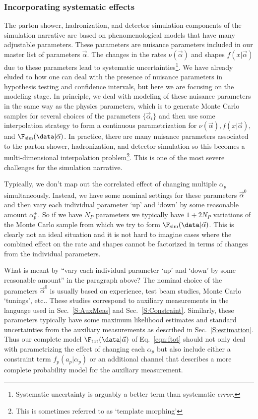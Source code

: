 \subsubsection{Incorporating systematic effects}


The parton shower, hadronization, and detector simulation components of the simulation narrative are based on phenomenological models that have many adjustable parameters.  These parameters are nuisance parameters included in our master list of parameters $\vec\alpha$.  The changes in the rates $\nu(\vec\alpha)$ and shapes $f(x|\vec\alpha)$ due to these parameters lead to systematic uncertainties\footnote{Systematic uncertainty is arguably a better term than systematic \textit{error}.}.  We have already eluded to how one can deal with the presence of nuisance parameters in hypothesis testing and confidence intervals, but here we are focusing on the modeling stage.  In principle, we deal with modeling of these nuisance parameters in the same way as the physics parameters, which is to generate Monte Carlo samples for several choices of the parameters $\{\vec\alpha_i\}$ and then use some interpolation strategy to form a continuous parametrization for $\nu(\vec\alpha), f(x|\vec\alpha)$, and $\F_{\rm sim}(\data|\vec\alpha)$.  In practice, there are many nuisance parameters associated to the parton shower, hadronization, and detector simulation so this becomes a multi-dimensional interpolation problem\footnote{This is sometimes referred to as `template morphing'}.  This is one of the most severe challenges for the simulation narrative.  


Typically, we don't map out the correlated effect of changing multiple $\alpha_p$ simultaneously.  Instead, we have some nominal settings for these parameters $\vec\alpha^0$ and then vary each individual parameter `up' and `down' by some reasonable amount $\alpha_p^\pm$.  So if we have $N_P$ parameters we typically have $1+2N_P$ variations of the Monte Carlo sample from which we try to form  $\F_{\rm sim}(\data|\vec\alpha)$.  This is clearly not an ideal situation and it is not hard to imagine cases where the combined effect on the rate and shapes cannot be factorized in terms of changes from the individual parameters.  


What is meant by ``vary each individual parameter `up' and `down' by some reasonable amount'' in the paragraph above?  The nominal choice of the parameters $\vec\alpha^0$ is usually based on experience, test beam studies,  Monte Carlo `tunings', etc..  These studies correspond to auxiliary measurements in the language used in Sec.~\ref{S:AuxMeas} and Sec.~\ref{S:Constraint}.  Similarly, these parameters typically have some maximum likelihood estimates and standard uncertainties from the auxiliary measurements as described in Sec.~\ref{S:estimation}. Thus our complete model $\F_{\rm tot}(\data|\vec\alpha)$ of Eq.~\ref{eqn:ftot} should not only deal with parametrizing the effect of changing each $\alpha_p$ but also include either a constraint term $f_p(a_p | \alpha_p)$ or an additional channel that describes a more complete probability model for the auxiliary measurement.  


